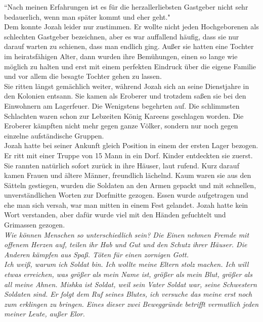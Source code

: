 ``Nach meinen Erfahrungen ist es für die herzallerliebsten Gastgeber nicht sehr bedauerlich, wenn 
man später kommt und eher geht."\\
Dem konnte Jozah leider nur zustimmen. Er wollte nicht jeden Hochgeborenen als schlechten Gastgeber 
bezeichnen, aber es war auffallend häufig, dass sie nur darauf warten zu schienen, dass man endlich 
ging. Außer sie hatten eine Tochter im heiratsfähigen Alter, dann wurden ihre Bemühungen, einen so 
lange wie möglich zu halten und erst mit einem perfekten Eindruck über die eigene Familie und vor 
allem die besagte Tochter gehen zu lassen.\\
Sie ritten längst gemächlich weiter, während Jozah sich an seine Dienstjahre in den Kolonien 
entsann. Sie kamen als Eroberer und trotzdem saßen sie bei den Einwohnern am Lagerfeuer. Die 
Wenigstens begehrten auf. Die schlimmsten Schlachten waren schon zur Lebzeiten König Kareens 
geschlagen worden. Die Eroberer kämpften nicht mehr gegen ganze Völker, sondern nur noch gegen 
einzelne aufständische Gruppen.\\
Jozah hatte bei seiner Ankunft gleich Position in einem der ersten Lager bezogen. Er ritt mit einer 
Truppe von 15 Mann in ein Dorf. Kinder entdeckten sie zuerst. Sie rannten natürlich sofort zurück 
in ihre Häuser, laut rufend. Kurz darauf kamen Frauen und ältere Männer, freundlich lächelnd. Kaum 
waren sie aus den Sätteln gestiegen, wurden die Soldaten an den Armen gepackt und mit schnellen, 
unverständlichen Worten zur Dorfmitte gezogen. Essen wurde aufgetragen und ehe man sich 
versah, war man mitten in einem Fest gelandet. Jozah hatte kein Wort verstanden, aber dafür wurde 
viel mit den Händen gefuchtelt und Grimassen gezogen. \\
\textit{Wie können Menschen so unterschiedlich sein? Die Einen nehmen Fremde mit offenem Herzen 
auf, teilen ihr Hab und Gut und den Schutz ihrer Häuser. Die Anderen kämpfen aus Spaß. Töten für 
einen zornigen Gott.\\
Ich weiß, warum ich Soldat bin. Ich wollte meine Eltern stolz machen. Ich will etwas erreichen, was 
größer als mein Name ist, größer als mein Blut, größer als all meine Ahnen. Mishka ist Soldat, weil 
sein Vater Soldat war, seine Schwestern Soldaten sind. Er folgt dem Ruf seines Blutes, ich versuche 
das meine erst noch zum erklingen zu bringen. Eines dieser zwei Beweggründe betrifft vermutlich 
jeden meiner Leute, außer Elor.}\\


